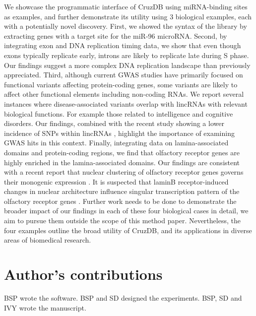 \documentclass[10pt]{bmc_article}
\newenvironment{bmcformat}{\baselineskip20pt\sloppy\setboolean{publ}{false}}{\baselineskip20pt\sloppy}
\begin{document}
\begin{bmcformat}
We showcase the programmatic interface of CruzDB using miRNA-binding sites as examples, and further demonstrate its utility using 3 biological examples, each with a potentially novel discovery.
First, we showed the syntax of the library by extracting genes with a target site for the miR-96 microRNA. 
Second, by integrating exon and DNA replication timing data, we show that even though exons typically replicate early, introns are likely to replicate late during S phase. 
Our findings suggest a more complex DNA replication landscape than previously appreciated. 
Third, although current GWAS studies have primarily focused on functional variants affecting protein-coding genes, some variants are likely to affect other functional elements including non-coding RNAs. 
We report several instances where disease-associated variants overlap with lincRNAs with relevant biological functions. 
For example those related to intelligence and cognitive disorders. 
Our findings, combined with the recent study showing a lower incidence of SNPs within lincRNAs \cite{Chen}, highlight the importance of examining GWAS hits in this context. 
Finally, integrating data on lamina-associated domains and protein-coding regions, we find that olfactory receptor genes are highly enriched in the lamina-associated domains. Our findings are consistent with a recent report that nuclear clustering of olfactory receptor genes governs their monogenic expression \cite{Clowney}. It is suspected that laminB receptor-induced changes in nuclear architecture influence singular transcription pattern of the olfactory receptor genes \cite{Clowney}. Further work needs to be done to demonstrate the broader impact of our findings in each of these four biological cases in detail, we aim to pursue them outside the scope of this method paper. Nevertheless, the four examples outline the broad utility of CruzDB, and its applications in diverse areas of biomedical research. 



\bigskip

\section*{Author's contributions}
BSP wrote the software. BSP and SD designed the experiments. BSP, SD and IVY wrote the manuscript.
    


\end{bmcformat}
\end{document}

